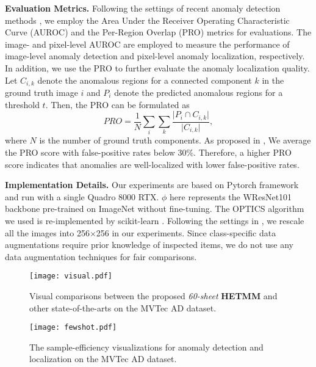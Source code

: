 \documentclass[default,iicol]{sn-jnl}\usepackage[algo2e,ruled,linesnumbered]{algorithm2e}
\theoremstyle{thmstyleone}\newtheorem{theorem}{Theorem}\newtheorem{proposition}[theorem]{Proposition}
\theoremstyle{thmstyletwo}\newtheorem{example}{Example}\newtheorem{remark}{Remark}
\theoremstyle{thmstylethree}\newtheorem{definition}{Definition}
\begin{document}
\noindent\textbf{Evaluation Metrics. }\label{sec:metrics}
Following the settings of recent anomaly detection methods \cite{US,patchcore}, we employ the Area Under the Receiver Operating Characteristic Curve (AUROC) and the Per-Region Overlap (PRO) \cite{MVTEC} metrics for evaluations.
The image- and pixel-level AUROC are employed to measure the performance of image-level anomaly detection and pixel-level anomaly localization, respectively.
In addition, we use the PRO to further evaluate the anomaly localization quality.
Let $C_{i,k}$ denote the anomalous regions for a connected component $k$ in the ground truth image $i$ and $P_{i}$ denote the predicted anomalous regions for a threshold $t$.
Then, the PRO can be formulated as
\begin{equation}
    PRO=\frac{1}{N}\sum_{i}\sum_{k}\frac{\vert P_{i}\cap C_{i,k}\vert}{\vert C_{i,k}\vert },
\end{equation}
where $N$ is the number of ground truth components.
As proposed in \cite{US}, We average the PRO score with false-positive rates below 30\%.
Therefore, a higher PRO score indicates that anomalies are well-localized with lower false-positive rates.

\noindent\textbf{Implementation Details. }
Our experiments are based on Pytorch \cite{Pytorch} framework and run with a single Quadro 8000 RTX.
$\phi$ here represents the WResNet101 \cite{wresnet} backbone pre-trained on ImageNet \cite{imagenet} without fine-tuning.
The OPTICS algorithm we used is re-implemented by scikit-learn \cite{scikit-learn}.
Following the settings in \cite{CutPaste}, we rescale all the images into 256$\times$256 in our experiments.
Since class-specific data augmentations require prior knowledge of inspected items, we do not use any data augmentation techniques for fair comparisons.

\begin{figure*}[!t]
    \centering
        \texttt{[image: visual.pdf]}
    \caption{Visual comparisons between the proposed \textit{60-sheet} \textbf{HETMM} and other state-of-the-arts on the MVTec AD dataset.
    }
    \label{fig:visual}
\end{figure*}

\begin{figure*}[!t]
    \centering
    \texttt{[image: fewshot.pdf]}
    \caption{
    The sample-efficiency visualizations for anomaly detection and localization on the MVTec AD dataset.
    }
    \label{fig:fewshot}
\end{figure*}
\end{document}
